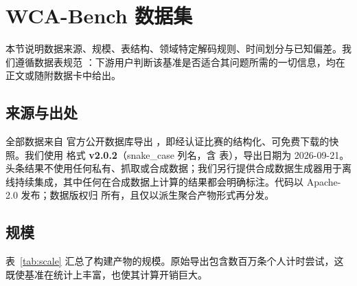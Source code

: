 \section{WCA-Bench 数据集}
\label{sec:dataset}

本节说明数据来源、规模、表结构、领域特定解码规则、时间划分与已知偏差。我们遵循数据表规范 \citep{datasheets}：下游用户判断该基准是否适合其问题所需的一切信息，均在正文或随附数据卡中给出。

\subsection{来源与出处}
\label{sec:data-source}

全部数据来自 \wca{} 官方公开数据库导出 \citep{wca_export}，即经认证比赛的结构化、可免费下载的快照。我们使用  格式 \textbf{v2.0.2}（snake\_case 列名，含  表），导出日期为 2026-09-21。头条结果不使用任何私有、抓取或合成数据；我们另行提供合成数据生成器用于离线持续集成，其中任何在合成数据上计算的结果都会明确标注。代码以 Apache-2.0 发布；数据版权归 \wca{} 所有，且仅以派生聚合产物形式再分发。

\subsection{规模}
\label{sec:data-scale}

表~\ref{tab:scale} 汇总了构建产物的规模。原始导出包含数百万条个人计时尝试，这既使基准在统计上丰富，也使其计算开销巨大。

